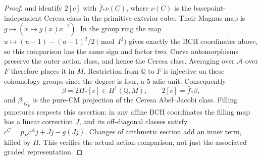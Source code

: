 \begin{proof}
\citet[Theorem 3 and \S8]{BHainMatsumoto2005} and
\citet[Corollary 2.17 and Proposition 2.23]{BBisognoEtAl2023}
identify $2[c]$ with $\bar f_*\nu(C)$, where $\nu(C)$ is the
basepoint-independent Ceresa class in the primitive exterior cube.
Their Magnus map is $g\mapsto(x\mapsto g(\widetilde x)
\widetilde x^{-1})$. In the group ring the map
$u\mapsto(u-1)-(u-1)^2/2\pmod{I^3}$ gives exactly the BCH
coordinates above, so this comparison has the same sign and factor
two. Curve automorphisms preserve the outer action class, and hence
the Ceresa class. Averaging over $\mathcal A$ over $F$ therefore
places it in $M$. Restriction from $\mathbb Q$ to $F$ is injective
on these cohomology groups since the degree is four, a $5$-adic
unit. Consequently
\[
 \beta=2\Pi_*[c]\in H^1(\mathbb Q,M),\qquad
 2[c]=\bar f_*\beta,
\]
and $\beta|_{G_F}$ is the pure-CM projection of the Ceresa
Abel--Jacobi class. Filling punctures respects this assertion: in
any affine BCH coordinates the filling map has a linear correction
$J$, and its off-diagonal classes satisfy
$c^C=p_Bc^Aj+Jj-g(Jj)$. Changes of arithmetic section add an inner
term, killed by $\Pi$. This verifies the actual action comparison,
not just the associated graded representation.
\end{proof}

